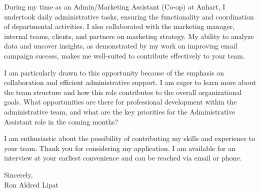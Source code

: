 \documentclass[letterpaper,11pt]{article}
\begin{document}
During my time as an Admin/Marketing Assistant (Co-op) at Anhart, I undertook daily administrative tasks, ensuring the functionality and coordination of departmental activities. I also collaborated with the marketing manager, internal teams, clients, and partners on marketing strategy. My ability to analyze data and uncover insights, as demonstrated by my work on improving email campaign success, makes me well-suited to contribute effectively to your team.
\vspace{10pt}

I am particularly drawn to this opportunity because of the emphasis on collaboration and efficient administrative support. I am eager to learn more about the team structure and how this role contributes to the overall organizational goals. What opportunities are there for professional development within the administrative team, and what are the key priorities for the Administrative Assistant role in the coming months?
\vspace{10pt}

I am enthusiastic about the possibility of contributing my skills and experience to your team. Thank you for considering my application. I am available for an interview at your earliest convenience and can be reached via email or phone.
\vspace{20pt}

Sincerely,\\
\vspace{40pt} %
Ron Aldred Lipat

\end{document}
